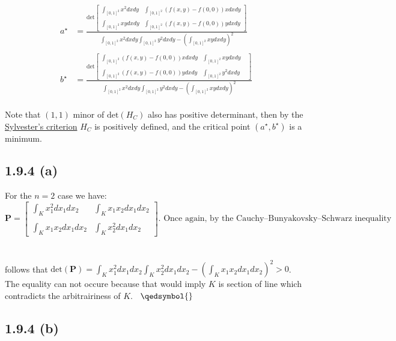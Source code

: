 \documentclass{exam}
\begin{document}
\begin{equation}
    \begin{aligned}
        a^\star&=
        \displaystyle \frac{ 
            \text{det}\begin{bmatrix}
                \displaystyle\int_{[0,1]^2} x^2 d x d y & \displaystyle\int_{[0,1]^2} (f(x,y) - f(0,0)) x d x d y\\
                \\
                \displaystyle\int_{[0,1]^2} xy d x d y & \displaystyle\int_{[0,1]^2} (f(x,y) - f(0,0)) y d x d y
            \end{bmatrix}
            }
            {
              \displaystyle\int_{[0,1]^2} x^2 d x d y \displaystyle\int_{[0,1]^2} y^2 d x d y  - (\displaystyle\int_{[0,1]^2} xy d x d y )^2
            }\\
        \\
        b^\star &=
       \displaystyle \frac{ 
           \text{det}\begin{bmatrix}
                \displaystyle\int_{[0,1]^2} (f(x,y) - f(0,0)) x d x d y & \displaystyle\int_{[0,1]^2} xy d x d y \\
               \\
                \displaystyle\int_{[0,1]^2} (f(x,y) - f(0,0)) y d x d y & \displaystyle\int_{[0,1]^2} y^2 d x d y &
           \end{bmatrix}
           }
           {
             \displaystyle\int_{[0,1]^2} x^2 d x d y \displaystyle\int_{[0,1]^2} y^2 d x d y  - (\displaystyle\int_{[0,1]^2} xy d x d y )^2
           }
    \end{aligned}
\end{equation}\\
Note that $(1,1)$ minor of $\text{det}( H_{C})$ also has positive determinant, then by the \href{https://en.wikipedia.org/wiki/Sylvester%27s_criterion}{Sylvester's criterion} $H_{C}$ is positively defined, and the critical point $(a^\star,b^\star)$ is a minimum. 
\\
\subsection*{1.9.4 (a)}
For the $n = 2$ case we have:\\
\begin{equation*}
    \pmb{\text{P}} = \begin{bmatrix}
        \displaystyle\int_{K} x_1^2 d x_1 d x_2 & \displaystyle\int_{K} x_1 x_2 d x_1 d x_2\\
       \\
       \displaystyle\int_{K} x_1 x_2 d x_1 d x_2 & \displaystyle\int_{K} x_2^2 d x_1 d x_2 
    \end{bmatrix} \text{. Once again, by the Cauchy–Bunyakovsky–Schwarz inequality}
\end{equation*}\\
\\
follows that $\text{det}(\pmb{\text{P}}) = \displaystyle\int_{K} x_1^2d x_1 d x_2  \displaystyle\int_{K} x_2^2 d x_1 d x_2  - (\displaystyle\int_{K} x_1 x_2 d x_1 d x_2 )^2 > 0$. The equality can not occure because that would imply $K$ is section of line which contradicts the arbitrairiness of $K$. \ $\qedsymbol{}$
\subsection*{1.9.4 (b)}
\end{document}
